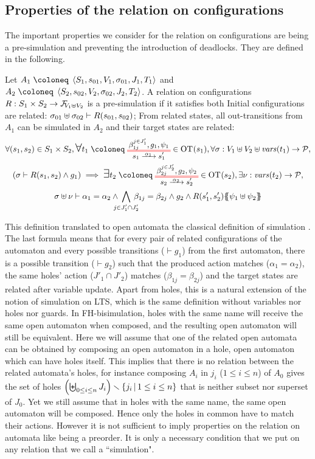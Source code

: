 \documentclass{article}
\begin{document}
\subsection{Properties of the relation on configurations}
The important properties we consider for the relation on configurations are being a pre-simulation and preventing the introduction of deadlocks.
They are defined in the following.
\begin{defi}
Let \(A_1 \defobject \OAg[1]\) and \(A_2 \defobject \OAg[2]\).
A relation on configurations \(R: S_1 \times S_2 \to \rformulas[V_1 \uplus V_2]\) is a pre-simulation if it satisfies both
 Initial configurations are related: \(\sigma_{01} \uplus \sigma_{02} \vdash R\mpar{s_{01}, s_{02}}\);
 From related states, all out-transitions from \(A_1\) can be simulated in \(A_2\) and their target states are related:
\begin{multline*}
	\forall \mpar{s_1, s_2} \in S_1 \times S_2, \bigsymb{\forall} t_1 \defobject \OTx{1}{}{1}{1} \in \fOT{s_1}, \forall \sigma: V_1 \uplus V_2 \uplus \fvars{t_1} \to \values, \\
	\mpar{\sigma \vdash R\mpar{s_1, s_2} \wedge g_1} \implies \bigsymb{\exists} t_2 \defobject \OTx{2}{}{2}{2} \in \fOT{s_2}, \exists \nu: \fvars{t_2} \to \values, \\
	\sigma \uplus \nu \vdash \alpha_1 = \alpha_2 \wedge \bigwedge_\subbox{j \in J'_1 \cap J'_2} \beta_{1j} = \beta_{2j} \wedge g_2 \wedge R\mpar{s'_1, s'_2}\psubst{\psi_1 \uplus \psi_2}
\end{multline*}
\end{defi}
This definition translated to open automata the classical definition of simulation \cite{10.1007/3-540-54430-5_78}.
The last formula means that for every pair of related configurations of the automaton and every possible transitions (\(\vdash g_1\)) from the first automaton, there is a possible transition (\(\vdash g_2\)) such that the produced action matches (\(\alpha_1 = \alpha_2\)), the same holes' action (\(J'_1 \cap J'_2\)) matches (\(\beta_{1j} = \beta_{2j}\)) and the target states are related after variable update. %
Apart from holes, this is a natural extension of the notion of simulation on LTS, which is the same definition without variables nor holes nor guards.
In FH-bisimulation, holes with the same name will receive the same open automaton when composed, and the resulting open automaton will still be equivalent.
Here we will assume that one of the related open automata can be obtained by composing an open automaton in a hole, open automaton which can have holes itself.
This implies that there is no relation between the related automata's holes, for instance composing \(A_i\) in \(j_i\) (\(1 \leq i \leq n\)) of \(A_0\) gives the set of holes \(\mpar{\biguplus_{0 \leq i \leq n} J_i} \setminus \mset{j_i}{1 \leq i \leq n}\) that is neither subset nor superset of \(J_0\).
Yet we still assume that in holes with the same name, the same open automaton will be composed.
Hence only the holes in common have to match their actions.
However it is not sufficient to imply properties on the relation on automata like being a preorder.
It is only a necessary condition that we put on any relation that we call a ``simulation".
\end{document}
